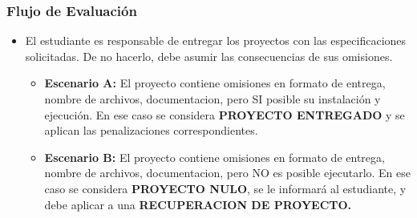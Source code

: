 \begin{frame}
\frametitle{Flujo de Evaluaci\'on}
\begin{itemize}
\item El estudiante es responsable de entregar los proyectos con las especificaciones solicitadas. De no hacerlo, debe asumir las consecuencias de sus omisiones.
\begin{itemize}
\item \textbf{Escenario A:} El proyecto contiene omisiones en formato de entrega, nombre de archivos, documentacion, pero SI posible su instalación y ejecución. En ese caso se considera \textbf{PROYECTO ENTREGADO} y se aplican las penalizaciones correspondientes.
\item \textbf{Escenario B:} El proyecto contiene omisiones en formato de entrega, nombre de archivos, documentacion, pero NO es posible ejecutarlo. En ese caso se considera \textbf{PROYECTO NULO}, se le informará al estudiante, y debe aplicar a una \textbf{RECUPERACION DE PROYECTO.} 
\end{itemize}
\end{itemize}
\end{frame}




